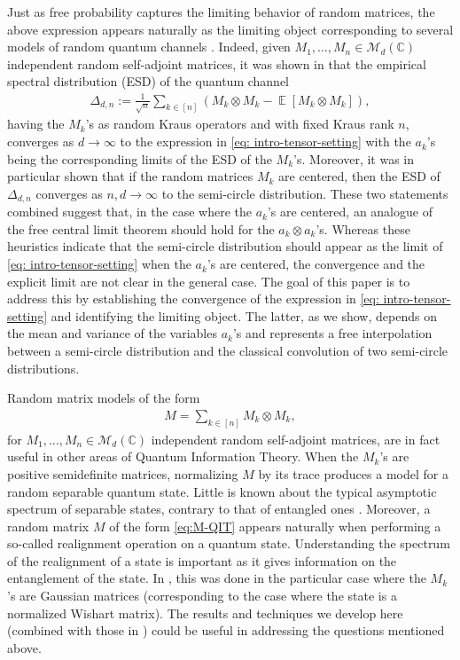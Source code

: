 \documentclass[12pt,reqno]{amsart}
\theoremstyle{plain}
\newcommand{\1}{\mathbf{1}}
\newcommand{\esp}{\operatorname{\mathbb{E}}}
\newcommand{\C}{\mathbb{C}}
\begin{document}
Just as free probability captures the limiting behavior of random matrices, the above expression appears naturally as the limiting object corresponding to several models of random quantum channels \cite{lancien2023limiting}. Indeed, given $M_1,\ldots,M_n \in \mathcal{M}_d(\C)$ independent random self-adjoint matrices, it was shown in \cite{lancien2023limiting} that the empirical spectral distribution (ESD) of the quantum channel 
\begin{align*}
    \Delta_{d,n}:=\frac{1}{\sqrt{n}}\sum_{k \in [n]} \left(M_k \otimes M_k-\esp [M_k \otimes M_k]\right),
\end{align*}
having the $M_k$'s as random Kraus operators and with fixed Kraus rank $n$, converges as $d\to \infty$ to the expression in \eqref{eq: intro-tensor-setting} with the $a_k$'s being the corresponding limits of the ESD of the $M_k$'s. Moreover, it was in particular shown that if the random matrices $M_k$ are centered, then the ESD of $\Delta_{d,n}$ converges as $n,d\to \infty$ to the semi-circle distribution. These two statements combined suggest that, in the case where the $a_k$'s are centered, an analogue of the free central limit theorem should hold for the $a_k\otimes a_k$'s. Whereas these heuristics indicate that the semi-circle distribution should appear as the limit of \eqref{eq: intro-tensor-setting} when the $a_k$'s are centered, the convergence and the explicit limit are not clear in the general case. 
The goal of this paper is to address this by establishing the convergence of the expression in \eqref{eq: intro-tensor-setting} and identifying the limiting object. 
The latter, as we show, depends on the mean and variance of the variables $a_k$'s and represents a free interpolation between a semi-circle distribution and the classical convolution of two semi-circle distributions.

Random matrix models of the form 
\begin{align} \label{eq:M-QIT}
    M = \sum_{k \in [n]}M_k \otimes M_k,
\end{align}
for $M_1,\ldots,M_n \in \mathcal{M}_d(\C)$ independent random self-adjoint matrices, are in fact useful in other areas of Quantum Information Theory. When the $M_k$'s are positive semidefinite matrices, normalizing $M$ by its trace produces a model for a random separable quantum state. Little is known about the typical asymptotic spectrum of separable states, contrary to that of entangled ones \cite{ambainis2012}. Moreover, a random matrix $M$ of the form \eqref{eq:M-QIT} appears naturally when performing a so-called realignment operation on a quantum state. Understanding the spectrum of the realignment of a state is important as it gives information on the entanglement of the state. In \cite{aubrun2012}, this was done in the particular case where the $M_k$'s are Gaussian matrices (corresponding to the case where the state is a normalized Wishart matrix). The results and techniques we develop here (combined with those in \cite{lancien2023limiting}) could be useful in addressing the questions mentioned above.
\end{document}
